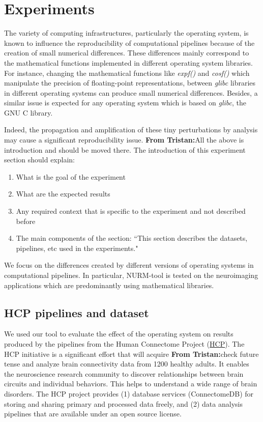 \documentclass[a4paper,num-refs]{oup-contemporary}
\newcommand{\tristan}[1]{\color{blue}\textbf{From Tristan:}#1\color{black}}
\begin{document}
\section{Experiments}

The variety of computing infrastructures, particularly the operating system, is 
known to influence the reproducibility of computational pipelines because of the
creation of small numerical differences. 
These differences mainly correspond to the mathematical functions implemented 
in different operating system libraries.
For instance, changing the mathematical functions like \emph{expf()} and 
\emph{cosf()} which manipulate the precision of floating-point representations, 
between \emph{glibc} libraries in different operating systems can produce 
small numerical differences.
Besides, a similar issue is expected for any operating system which is 
based on \emph{glibc}, the GNU C library.

Indeed, the propagation and amplification of these tiny perturbations by analysis 
may cause a significant reproducibility issue. \tristan{All the above is introduction and should be moved there.
The introduction of this experiment section should explain:
\begin{enumerate}
  \item What is the goal of the experiment
  \item What are the expected results 
  \item Any required context that is specific to the experiment and not described before
  \item The main components of the section: ``This section describes 
  the datasets, pipelines, etc used in the experiments."
\end{enumerate}
}
We focus on the differences 
created by different versions of operating systems in computational pipelines. 
In particular, NURM-tool is tested on the neuroimaging applications which are 
predominantly using mathematical libraries. 

\subsection{HCP pipelines and dataset}

We used our tool to evaluate the effect of the operating system on results 
produced by the pipelines from the Human Connectome Project (\href{https://www.humanconnectome.org}{HCP}).
The HCP initiative is a significant effort that will acquire \tristan{check future tense} and analyze 
brain connectivity data from 1200 healthy adults.
It enables the neuroscience 
research community to discover relationships between brain circuits and 
individual behaviors. This helps to understand a wide range of brain disorders.
The HCP project provides (1) database services (ConnectomeDB) for storing and 
sharing primary and processed data freely, and (2) data analysis pipelines that 
are available under an open source license.
\end{document}
